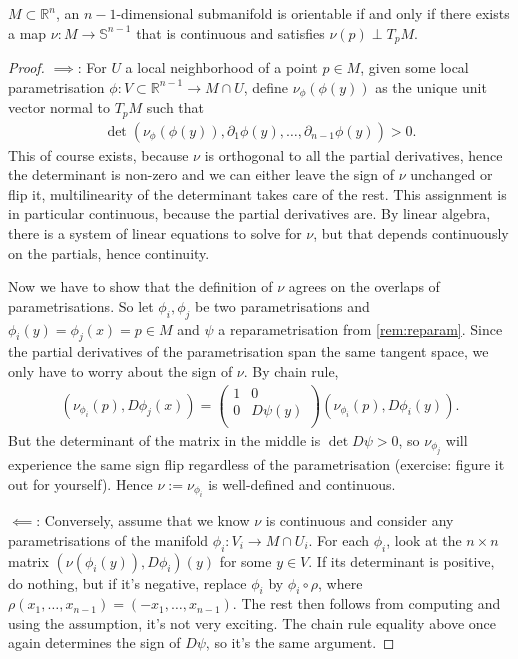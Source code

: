 \begin{prop}\label{prop:norm-orient}
	$M \subset \mathbb{R}^{n}$, an $n-1$-dimensional submanifold is orientable if and only if there exists a map $\nu: M \to \mathbb{S}^{n-1}$ that is continuous and satisfies $\nu(p) \perp T_{p}M$.
\end{prop}
\begin{proof}
	$\implies$: For $U$ a local neighborhood of a point $p \in M$, given some local parametrisation $\phi: V \subset \mathbb{R}^{n-1} \to M \cap U$, define $\nu_{\phi}(\phi(y))$ as the unique unit vector normal to $T_{p}M$ such that
	\begin{align*}
		\det (\nu_{\phi}(\phi(y)), \partial_{1}\phi(y), \dots, \partial_{n-1}\phi(y)) > 0.
	\end{align*}
	This of course exists, because $\nu$ is orthogonal to all the partial derivatives, hence the determinant is non-zero and we can either leave the sign of $\nu$ unchanged or flip it, multilinearity of the determinant takes care of the rest. This assignment is in particular continuous, because the partial derivatives are. By linear algebra, there is a system of linear equations to solve for $\nu$, but that depends continuously on the partials, hence continuity.

	Now we have to show that the definition of $\nu$ agrees on the overlaps of parametrisations. So let $\phi_{i}, \phi_{j}$ be two parametrisations and $\phi_{i}(y) = \phi_{j}(x) = p \in M$ and $\psi$ a reparametrisation from \ref{rem:reparam}. Since the partial derivatives of the parametrisation span the same tangent space, we only have to worry about the sign of $\nu$. By chain rule,
	\begin{align*}
		(\nu_{\phi_{i}}(p), D \phi_{j}(x)) =
		\begin{pmatrix}
			1 & 0        \\
			0 & D\psi(y) \\
		\end{pmatrix} (\nu_{\phi_{i}}(p), D\phi_{i}(y)).
	\end{align*}
	But the determinant of the matrix in the middle is $\det D \psi > 0$, so $\nu_{\phi_{j}}$ will experience the same sign flip regardless of the parametrisation (exercise: figure it out for yourself). Hence $\nu := \nu_{\phi_{i}}$ is well-defined and continuous.

	$\impliedby$: Conversely, assume that we know $\nu$ is continuous and consider any parametrisations of the manifold ${\phi}_{i}: V_{i} \to M \cap U_{i}$. For each $\phi_{i}$, look at the $n \times n$ matrix $(\nu(\phi_{i}(y)), D {\phi}_{i})(y)$ for some $y \in V$. If its determinant is positive, do nothing, but if it's negative, replace ${\phi}_{i}$ by ${\phi}_{i} \circ \rho$, where $\rho(x_{1}, \dots, x_{n-1}) = (-x_{1}, \dots, x_{n-1})$. The rest then follows from computing and using the assumption, it's not very exciting. The chain rule equality above once again determines the sign of $D\psi$, so it's the same argument.
\end{proof}

